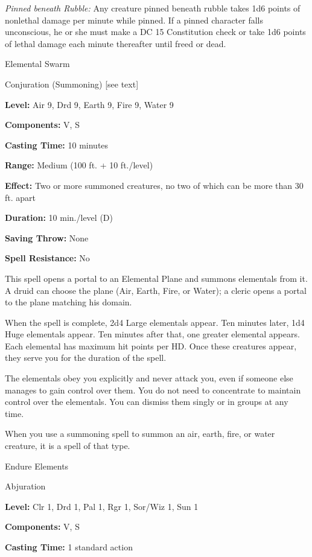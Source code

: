 \documentclass{article}
\begin{document}
\textit{Pinned beneath Rubble: }Any creature pinned beneath rubble takes 1d6 points 
of nonlethal damage per minute while pinned. If a pinned character falls unconscious, 
he or she must make a DC 15 Constitution check or take 1d6 points of lethal damage 
each minute thereafter until freed or dead.

\vspace{12pt}
Elemental Swarm

Conjuration (Summoning) [see text]

\textbf{Level:} Air 9, Drd 9, Earth 9, Fire 9, Water 9

\textbf{Components:} V, S

\textbf{Casting Time:} 10 minutes

\textbf{Range: }Medium (100 ft. + 10 ft./level)

\textbf{Effect:} Two or more summoned creatures, no two of which can be more than 
30 ft. apart

\textbf{Duration:} 10 min./level (D)

\textbf{Saving Throw:} None

\textbf{Spell Resistance:} No

This spell opens a portal to an Elemental Plane and summons elementals from it. 
A druid can choose the plane (Air, Earth, Fire, or Water); a cleric opens a portal 
to the plane matching his domain.

When the spell is complete, 2d4 Large elementals appear. Ten minutes later, 1d4 
Huge elementals appear. Ten minutes after that, one greater elemental appears. 
Each elemental has maximum hit points per HD. Once these creatures appear, they 
serve you for the duration of the spell.

The elementals obey you explicitly and never attack you, even if someone else manages 
to gain control over them. You do not need to concentrate to maintain control over 
the elementals. You can dismiss them singly or in groups at any time.

When you use a summoning spell to summon an air, earth, fire, or water creature, 
it is a spell of that type.

\vspace{12pt}
Endure Elements

Abjuration

\textbf{Level:} Clr 1, Drd 1, Pal 1, Rgr 1, Sor/Wiz 1, Sun 1

\textbf{Components:} V, S

\textbf{Casting Time:} 1 standard action
\end{document}
